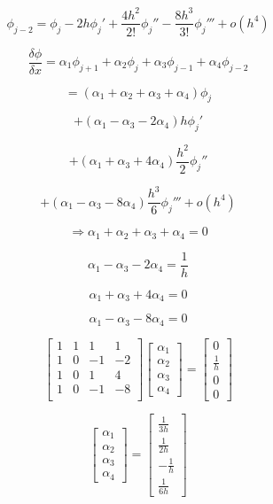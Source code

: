 \documentclass[12pt,a4paper]{report}
\begin{document}
\begin{enumerate}
$$\phi_{j-2} = \phi_j - 2h{\phi_j}' + \frac{4h^2}{2!}{\phi_j}'' - \frac{8h^3}{3!}{\phi_j}''' + o\left(h^4\right)$$

$$\frac{\delta\phi}{\delta x} = \alpha_1\phi_{j+1} + \alpha_2\phi_{j} + \alpha_3\phi_{j-1} + \alpha_4\phi_{j-2}$$

$$= \left(\alpha_1 + \alpha_2 + \alpha_3 + \alpha_4\right)\phi_j$$

$$+ \left(\alpha_1 - \alpha_3 - 2\alpha_4\right)h{\phi_j}'$$

$$+ \left(\alpha_1 + \alpha_3 + 4\alpha_4\right)\frac{h^2}{2}{\phi_j}''$$

$$+ \left(\alpha_1 - \alpha_3 - 8\alpha_4\right)\frac{h^3}{6}{\phi_j}''' + o\left(h^4\right)$$

$$\Rightarrow \alpha_1 + \alpha_2 + \alpha_3 + \alpha_4 = 0$$

$$\alpha_1 - \alpha_3 -2\alpha_4 = \frac{1}{h}$$

$$\alpha_1 + \alpha_3 + 4\alpha_4 = 0$$

$$\alpha_1 - \alpha_3 - 8\alpha_4 = 0$$

\pagebreak

$$\begin{bmatrix}
1 & 1 & 1 & 1 \\
1 & 0 & -1 & -2 \\
1 & 0 & 1 & 4 \\
1 & 0 & -1 & -8 \\
\end{bmatrix}
\begin{bmatrix}
\alpha_1 \\ \alpha_2 \\ \alpha_3 \\ \alpha_4
\end{bmatrix} = 
\begin{bmatrix}
0 \\ \frac{1}{h} \\ 0 \\ 0
\end{bmatrix}$$

$$\begin{bmatrix}
\alpha_1 \\ \alpha_2 \\ \alpha_3 \\ \alpha_4
\end{bmatrix} = 
\begin{bmatrix}
\frac{1}{3h} \\ \frac{1}{2h} \\ -\frac{1}{h} \\ \frac{1}{6h}
\end{bmatrix}$$


\end{enumerate}
\end{document}
